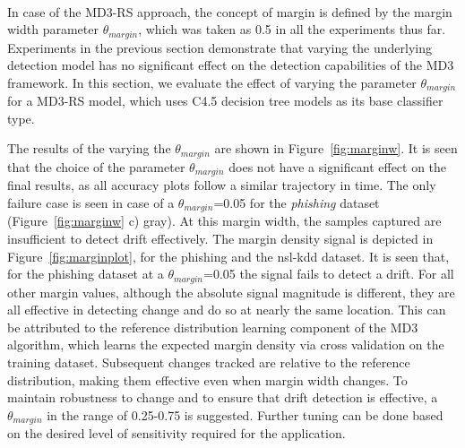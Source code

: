 \documentclass[authoryear,3p,times,twocolumn]{elsarticle}
\begin{document}
\begin{figure*}[t]
\centering
{}
 \\
\caption{Effects of varying the margin width ($\theta_{margin}$) on the drift detection process of MD3.}
\label{fig:marginw}
\end{figure*}

\begin{figure*}[t]
\centering
{}
\caption{Margin density metric over time, for different values of ($\theta_{margin}$).}
\label{fig:marginplot}
\end{figure*}

In case of the MD3-RS approach, the concept of margin is defined by the margin width parameter $\theta_{margin}$, which was taken as 0.5 in all the experiments thus far. Experiments in the previous section demonstrate that varying the underlying detection model has no significant effect on the detection capabilities of the MD3 framework. In this section, we evaluate the effect of varying the parameter $\theta_{margin}$ for a MD3-RS model, which uses C4.5 decision tree models as its base classifier type.

The results of the varying the $\theta_{margin}$ are shown in Figure~\ref{fig:marginw}. It is seen that the choice of the parameter $\theta_{margin}$ does not have a significant effect on the final results, as all accuracy plots follow a similar trajectory in time. The only failure case is seen in case of a $\theta_{margin}$=0.05 for the \textit{phishing} dataset (Figure~\ref{fig:marginw} c) gray). At this margin width, the samples captured are insufficient to detect drift effectively. The margin density signal is depicted in Figure~\ref{fig:marginplot}, for the phishing and the nsl-kdd dataset. It is seen that, for the phishing dataset at a $\theta_{margin}$=0.05 the signal fails to detect a drift. For all other margin values, although the absolute signal magnitude is different, they are all effective in detecting change and do so at nearly the same location. This can be attributed to the reference distribution learning component of the MD3 algorithm, which learns the expected margin density via cross validation on the training dataset. Subsequent changes tracked are relative to the reference distribution, making them effective even when margin width changes. To maintain robustness to change and to ensure that drift detection is effective, a $\theta_{margin}$ in the range of 0.25-0.75 is suggested. Further tuning can be done based on the desired level of sensitivity required for the application. 
\end{document}
